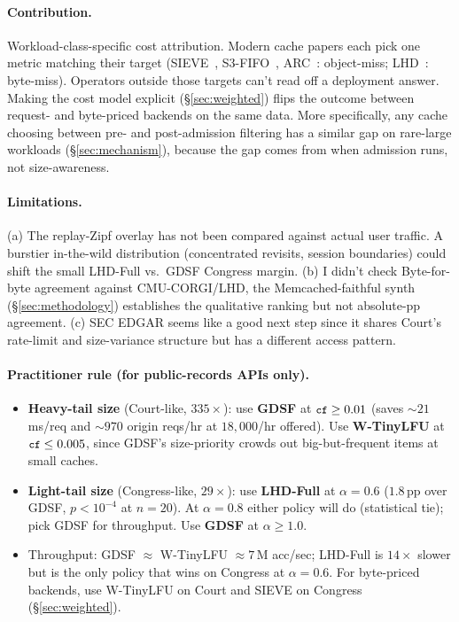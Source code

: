 \documentclass[letterpaper,twocolumn,10pt]{article}
\newcommand{\code}[1]{\texttt{\small #1}}
\begin{document}
\paragraph{Contribution.} Workload-class-specific cost attribution.
Modern cache papers each pick one metric matching their target
(SIEVE~\cite{zhang2024sieve}, S3-FIFO~\cite{yang2023fifo},
ARC~\cite{megiddo2003arc}: object-miss;
LHD~\cite{beckmann2018lhd}: byte-miss). Operators outside those
targets can't read off a deployment answer. Making the cost model
explicit (\S\ref{sec:weighted}) flips the outcome between request-
and byte-priced backends on the same data. More specifically, any cache choosing between pre- and post-admission filtering
has a similar gap on rare-large workloads
(\S\ref{sec:mechanism}), because the gap comes from when
admission runs, not size-awareness.
\paragraph{Limitations.} (a) The replay-Zipf overlay has not been
compared against actual user traffic. A burstier in-the-wild
distribution (concentrated revisits, session boundaries) could
shift the small LHD-Full vs.\ GDSF Congress margin. (b)
I didn't check Byte-for-byte agreement against CMU-CORGI/LHD,
the Memcached-faithful synth (\S\ref{sec:methodology}) establishes
the qualitative ranking but not absolute-pp agreement. (c) SEC
EDGAR seems like a good next step since it shares Court's rate-limit and
size-variance structure but has a different access pattern.
\paragraph{Practitioner rule (for public-records APIs only).}
\begin{itemize}[leftmargin=*,itemsep=1pt,topsep=1pt]
  \item \textbf{Heavy-tail size} (Court-like, $335\times$): use
    \textbf{GDSF} at $\code{cf} \geq 0.01$ (saves $\sim 21$\,ms/req
    and $\sim 970$ origin reqs/hr at $18{,}000$/hr offered). Use
    \textbf{W-TinyLFU} at $\code{cf} \leq 0.005$, since GDSF's
    size-priority crowds out big-but-frequent items at small caches.
  \item \textbf{Light-tail size} (Congress-like, $29\times$):
    use \textbf{LHD-Full} at $\alpha = 0.6$ ($1.8$\,pp over GDSF,
    $p<10^{-4}$ at $n{=}20$). At $\alpha = 0.8$ either policy
    will do (statistical tie); pick GDSF for throughput. Use
    \textbf{GDSF} at $\alpha \geq 1.0$.
  \item Throughput: GDSF $\approx$ W-TinyLFU $\approx 7$\,M acc/sec;
    LHD-Full is $14\times$ slower but is the only policy that wins
    on Congress at $\alpha = 0.6$. For byte-priced backends, use
    W-TinyLFU on Court and SIEVE on Congress (\S\ref{sec:weighted}).
\end{itemize}
\end{document}
